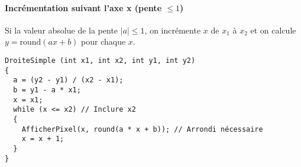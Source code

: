 \documentclass{article}
\begin{document}
\paragraph{Incrémentation suivant l'axe x (pente $\le 1$)}
Si la valeur absolue de la pente $|a| \le 1$, on incrémente $x$ de $x_1$ à $x_2$ et on calcule $y = \text{round}(ax + b)$ pour chaque $x$.

\begin{lstlisting}[language=Pseudocode, caption={Algorithme simple basé sur l'équation cartésienne (incrémentation en x)}, label={lst:droitesimple_x}]
DroiteSimple (int x1, int x2, int y1, int y2)
{
  a = (y2 - y1) / (x2 - x1);
  b = y1 - a * x1;
  x = x1;
  while (x <= x2) // Inclure x2
  {
    AfficherPixel(x, round(a * x + b)); // Arrondi nécessaire
    x = x + 1;
  }
}
\end{lstlisting}
\end{document}
